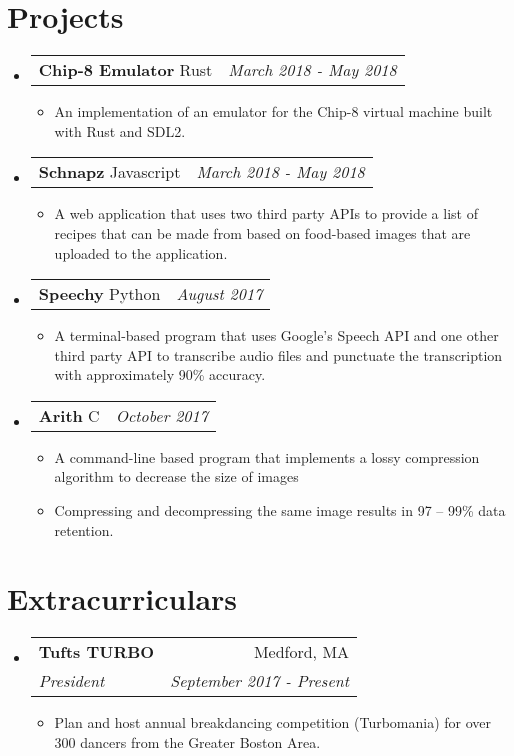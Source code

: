 \documentclass[letterpaper,11pt]{article}
\makeatletter
\newcommand{\resumeItem}[1]{
  \item[{{\textbullet}}]\small{{#1 \vspace{-2pt}}
  }
}
\newcommand{\resumeSubheading}[4]{
  \vspace{-1pt}\item[]
    \begin{tabular*}{0.97\textwidth}{l@{\extracolsep{\fill}}r}
      \textbf{#1} & #2 \\
      \textit{\small#3} & \textit{\small #4} \\
    \end{tabular*}\vspace{-5pt}
}
\newcommand{\projectSubheading}[3]{
  \vspace{-1pt}\item[]
    \begin{tabular*}{0.97\textwidth}{l@{\extracolsep{\fill}}r}
      \textbf{#1 \cdot \space}{\small #2}& \textit{\small #3} \\
    \end{tabular*}\vspace{-5pt}
}
\newcommand{\resumeSubHeadingListStart}{\begin{itemize}[leftmargin=*]}
\newcommand{\resumeSubHeadingListEnd}{\end{itemize}}
\newcommand{\resumeItemListStart}{\begin{itemize}}
\newcommand{\resumeItemListEnd}{\end{itemize}\vspace{-5pt}}
\makeatother
\begin{document}
\section{Projects}
  \resumeSubHeadingListStart
    \projectSubheading
      {Chip-8 Emulator}{Rust}{March 2018 - May 2018}
      \resumeItemListStart
        \resumeItem
          {An implementation of an emulator for the Chip-8 virtual machine built with Rust and SDL2.}
      \resumeItemListEnd

    \projectSubheading
      {Schnapz}{Javascript}{March 2018 - May 2018}
      \resumeItemListStart
        \resumeItem
          {A web application that uses two third party APIs to provide a list of recipes that can be made from based on food-based images that are uploaded to the application.}
      \resumeItemListEnd
    \projectSubheading
      {Speechy}{Python}{August 2017}
      \resumeItemListStart
        \resumeItem
          {A terminal-based program that uses Google’s Speech API and one other third party API to transcribe audio files and punctuate the transcription with approximately 90\% accuracy.}
  
      \resumeItemListEnd

    \projectSubheading
      {Arith}{C}{October 2017}
      \resumeItemListStart
        \resumeItem
          {A command-line based program that implements a lossy compression algorithm to decrease the size of images}
        \resumeItem
          {Compressing and decompressing the same image results in 97 – 99\% data retention.}
      \resumeItemListEnd
  \resumeSubHeadingListEnd

\section{Extracurriculars}
\resumeSubHeadingListStart
  \resumeSubheading
    {Tufts TURBO}{Medford, MA}
      {President}{September 2017 - Present}
      \resumeItemListStart
        \resumeItem
          {Plan and host annual breakdancing competition (Turbomania) for over 300 dancers from the Greater Boston Area.}
      \resumeItemListEnd

\resumeSubHeadingListEnd
\end{document}
